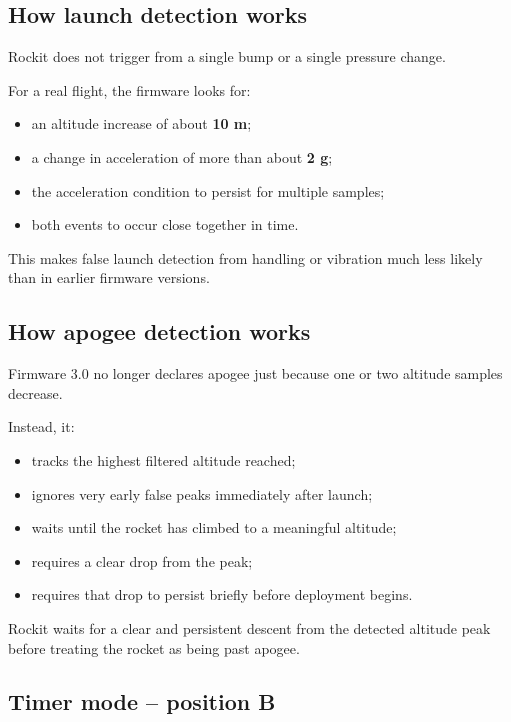 \documentclass[11pt,a4paper]{article}
\begin{document}
\subsection{How launch detection works}

Rockit does not trigger from a single bump or a single pressure change.

For a real flight, the firmware looks for:

\begin{itemize}
    \item an altitude increase of about \textbf{10 m};
    \item a change in acceleration of more than about \textbf{2 g};
    \item the acceleration condition to persist for multiple samples;
    \item both events to occur close together in time.
\end{itemize}

This makes false launch detection from handling or vibration much less likely than in earlier firmware versions.

\subsection{How apogee detection works}

Firmware 3.0 no longer declares apogee just because one or two altitude samples decrease.

Instead, it:

\begin{itemize}
    \item tracks the highest filtered altitude reached;
    \item ignores very early false peaks immediately after launch;
    \item waits until the rocket has climbed to a meaningful altitude;
    \item requires a clear drop from the peak;
    \item requires that drop to persist briefly before deployment begins.
\end{itemize}

\begin{importantbox}
Rockit waits for a clear and persistent descent from the detected altitude peak before treating the rocket as being past apogee.
\end{importantbox}

\subsection{Timer mode -- position B}
\end{document}
